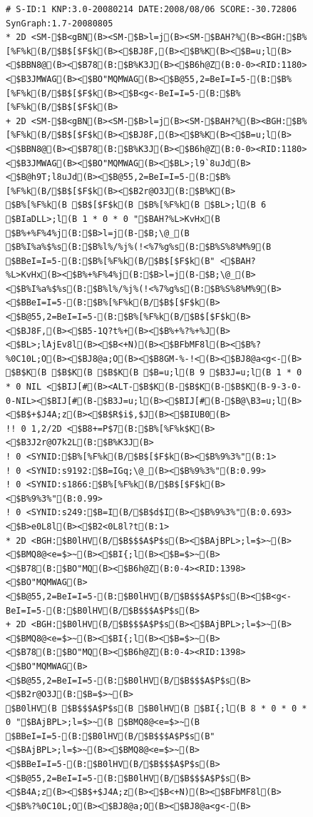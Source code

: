 \documentclass[a4j]{jarticle}
\begin{document}
{{{{{{{{{\begin{figure}[t]
\footnotesize
\begin{center}
\begin{minipage}{\hsize}
\begin{verbatim}
# S-ID:1 KNP:3.0-20080214 DATE:2008/08/06 SCORE:-30.72806 SynGraph:1.7-20080805
* 2D <SM-$B<gBN(B><SM-$B>l=j(B><SM-$BAH?%(B><BGH:$B%[%F%k(B/$B$[$F$k(B><$BJ8F,(B><$B%K(B><$B=u;l(B><$BBN8@(B><$B78(B:$B%K3J(B><$B6h@Z(B:0-0><RID:1180><$B3JMWAG(B><$BO"MQMWAG(B><$B@55,2=BeI=I=5-(B:$B%[%F%k(B/$B$[$F$k(B><$B<g<-BeI=I=5-(B:$B%[%F%k(B/$B$[$F$k(B>
+ 2D <SM-$B<gBN(B><SM-$B>l=j(B><SM-$BAH?%(B><BGH:$B%[%F%k(B/$B$[$F$k(B><$BJ8F,(B><$B%K(B><$B=u;l(B><$BBN8@(B><$B78(B:$B%K3J(B><$B6h@Z(B:0-0><RID:1180><$B3JMWAG(B><$BO"MQMWAG(B><$BL>;l9`8uJd(B><$B@h9T;l8uJd(B><$B@55,2=BeI=I=5-(B:$B%[%F%k(B/$B$[$F$k(B><$B2r@O3J(B:$B%K(B>
$B%[%F%k(B $B$[$F$k(B $B%[%F%k(B $BL>;l(B 6 $BIaDLL>;l(B 1 * 0 * 0 "$BAH?%L>KvHx(B $B%+%F%4%j(B:$B>l=j(B-$B;\@_(B $B%I%a%$%s(B:$B%l%/%j%(!<%7%g%s(B:$B%S%8%M%9(B $BBeI=I=5-(B:$B%[%F%k(B/$B$[$F$k(B" <$BAH?%L>KvHx(B><$B%+%F%4%j(B:$B>l=j(B-$B;\@_(B><$B%I%a%$%s(B:$B%l%/%j%(!<%7%g%s(B:$B%S%8%M%9(B><$BBeI=I=5-(B:$B%[%F%k(B/$B$[$F$k(B><$B@55,2=BeI=I=5-(B:$B%[%F%k(B/$B$[$F$k(B><$BJ8F,(B><$B5-1Q?t%+(B><$B%+%?%+%J(B><$BL>;lAjEv8l(B><$B<+N)(B><$BFbMF8l(B><$B%?%0C10L;O(B><$BJ8@a;O(B><$B8GM-%-!<(B><$BJ8@a<g<-(B>
$B$K(B $B$K(B $B$K(B $B=u;l(B 9 $B3J=u;l(B 1 * 0 * 0 NIL <$BIJ[#(B><ALT-$B$K(B-$B$K(B-$B$K(B-9-3-0-0-NIL><$BIJ[#(B-$B3J=u;l(B><$BIJ[#(B-$B@\B3=u;l(B><$B$+$J4A;z(B><$B$R$i$,$J(B><$BIUB0(B>
!! 0 1,2/2D <$B8+=P$7(B:$B%[%F%k$K(B><$B3J2r@O7k2L(B:$B%K3J(B>
! 0 <SYNID:$B%[%F%k(B/$B$[$F$k(B><$B%9%3%"(B:1>
! 0 <SYNID:s9192:$B=IGq;\@_(B><$B%9%3%"(B:0.99>
! 0 <SYNID:s1866:$B%[%F%k(B/$B$[$F$k(B><$B%9%3%"(B:0.99>
! 0 <SYNID:s249:$B=I(B/$B$d$I(B><$B%9%3%"(B:0.693><$B>e0L8l(B><$B2<0L8l?t(B:1>
* 2D <BGH:$B0lHV(B/$B$$$A$P$s(B><$BAjBPL>;l=$>~(B><$BMQ8@<e=$>~(B><$BI{;l(B><$B=$>~(B><$B78(B:$BO"MQ(B><$B6h@Z(B:0-4><RID:1398><$BO"MQMWAG(B><$B@55,2=BeI=I=5-(B:$B0lHV(B/$B$$$A$P$s(B><$B<g<-BeI=I=5-(B:$B0lHV(B/$B$$$A$P$s(B>
+ 2D <BGH:$B0lHV(B/$B$$$A$P$s(B><$BAjBPL>;l=$>~(B><$BMQ8@<e=$>~(B><$BI{;l(B><$B=$>~(B><$B78(B:$BO"MQ(B><$B6h@Z(B:0-4><RID:1398><$BO"MQMWAG(B><$B@55,2=BeI=I=5-(B:$B0lHV(B/$B$$$A$P$s(B><$B2r@O3J(B:$B=$>~(B>
$B0lHV(B $B$$$A$P$s(B $B0lHV(B $BI{;l(B 8 * 0 * 0 * 0 "$BAjBPL>;l=$>~(B $BMQ8@<e=$>~(B $BBeI=I=5-(B:$B0lHV(B/$B$$$A$P$s(B" <$BAjBPL>;l=$>~(B><$BMQ8@<e=$>~(B><$BBeI=I=5-(B:$B0lHV(B/$B$$$A$P$s(B><$B@55,2=BeI=I=5-(B:$B0lHV(B/$B$$$A$P$s(B><$B4A;z(B><$B$+$J4A;z(B><$B<+N)(B><$BFbMF8l(B><$B%?%0C10L;O(B><$BJ8@a;O(B><$BJ8@a<g<-(B>

\end{verbatim}
\end{minipage}
\end{center}
\end{figure}}}}}}}}}}
\end{document}
